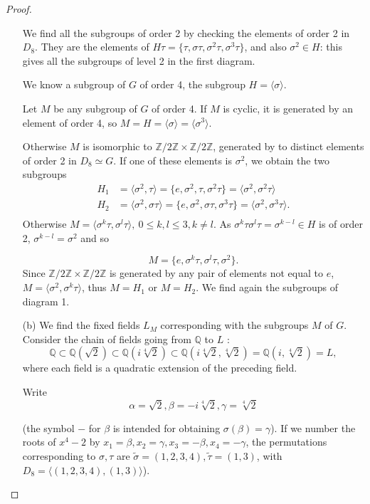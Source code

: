 \documentclass[11pt,a4paper]{article}
\newcommand{\Q}{\mathbb{Q}}
\newcommand{\Z}{\mathbb{Z}}
\begin{document}
\begin{proof}
\begin{enumerate}
We find all the subgroups of order 2 by checking the elements of order 2 in $D_8$. They are the elements of $H \tau = \{\tau, \sigma \tau, \sigma^2 \tau, \sigma^3 \tau\}$, and also $\sigma^2 \in H$: this gives all the subgroups of level 2 in the first diagram.

We know a subgroup of $G$ of order 4,  the subgroup $H = \langle \sigma \rangle$.

Let $M$ be any subgroup of $G$ of order 4. If $M$ is cyclic, it is generated by an element of order 4, so $M = H = \langle \sigma \rangle = \langle \sigma^3 \rangle$.

Otherwise $M$ is isomorphic to $\Z/2\Z \times \Z/2\Z$, generated by to distinct elements of order 2 in $D_8 \simeq G$.
If one of these elements is $\sigma^2$, we obtain the two subgroups
\begin{align*}
H_1 &= \langle \sigma^2, \tau\rangle =\{e, \sigma^2,\tau,\sigma^2\tau\} = \langle \sigma^2, \sigma^2 \tau\rangle\\
H_2 &= \langle \sigma^2, \sigma \tau\rangle =\{e, \sigma^2,\sigma \tau,\sigma^3\tau\}= \langle \sigma^2, \sigma^3 \tau\rangle.\\
\end{align*}
Otherwise $M = \langle \sigma^k \tau ,\sigma^l \tau\rangle,\ 0\leq k,l \leq 3,k\neq l$. As $\sigma^k\tau \sigma^l \tau = \sigma^{k-l} \in H$ is of order 2, $\sigma^{k-l} = \sigma^2$ and so 

$$M = \{e, \sigma^k \tau, \sigma^l \tau, \sigma^{2} \}.$$
Since $\Z/2\Z \times \Z/2\Z$ is generated by any pair of elements not equal to $e$, $M = \langle \sigma^2, \sigma^k \tau\rangle$, thus $M = H_1$ or $M = H_2$. We find again the subgroups of diagram 1.

\item[(b)]
We find the fixed fields $L_M$ corresponding with the subgroups  $M$ of $G$.
Consider the chain of fields going from $\Q$ to $L$ : 
$$\Q\subset \Q(\sqrt{2}) \subset \Q(i\sqrt[4]{2}) \subset \Q(i\sqrt[4]{2}, \sqrt[4]{2})= \Q(i,\sqrt[4]{2}) = L,$$
where each field is a quadratic extension of the preceding field. 

Write $$\alpha = \sqrt{2}, \beta = -i\sqrt[4]{2}, \gamma =\sqrt[4]{2}$$

(the symbol $-$ for $\beta$ is intended for obtaining $\sigma(\beta) = \gamma$). If we number the roots of $x^4-2$ by $x_1 = \beta, x_2 = \gamma, x_3 = -\beta, x_4 = -\gamma$, the permutations corresponding to $\sigma, \tau$ are $\tilde{\sigma} = (1,2,3,4), \tilde{\tau} = (1,3)$, with $D_8 = \langle(1,2,3,4),(1,3)\rangle$).


\end{enumerate}
\end{proof}
\end{document}
